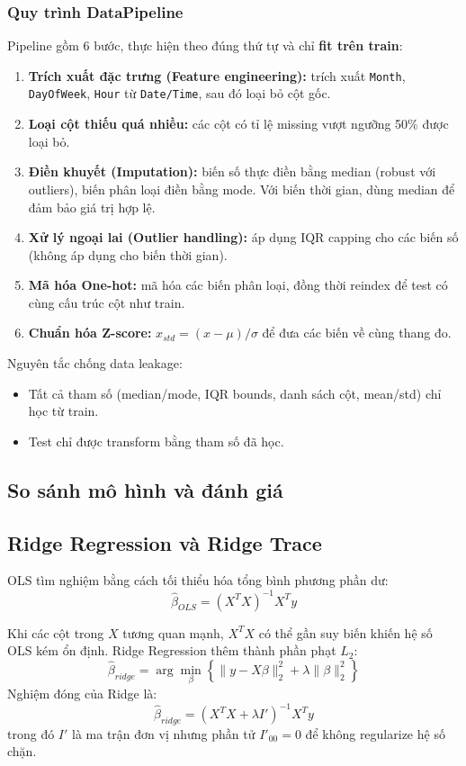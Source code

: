 \documentclass[a4paper]{article}
\begin{document}
\subsubsection{Quy trình DataPipeline}
Pipeline gồm 6 bước, thực hiện theo đúng thứ tự và chỉ \textbf{fit trên train}:
\begin{enumerate}
    \item \textbf{Trích xuất đặc trưng (Feature engineering):} trích xuất \texttt{Month}, \texttt{DayOfWeek}, \texttt{Hour} từ \texttt{Date/Time}, sau đó loại bỏ cột gốc.
    \item \textbf{Loại cột thiếu quá nhiều:} các cột có tỉ lệ missing vượt ngưỡng 50\% được loại bỏ.
    \item \textbf{Điền khuyết (Imputation):} biến số thực điền bằng median (robust với outliers), biến phân loại điền bằng mode. Với biến thời gian, dùng median để đảm bảo giá trị hợp lệ.
    \item \textbf{Xử lý ngoại lai (Outlier handling):} áp dụng IQR capping cho các biến số (không áp dụng cho biến thời gian).
    \item \textbf{Mã hóa One-hot:} mã hóa các biến phân loại, đồng thời reindex để test có cùng cấu trúc cột như train.
    \item \textbf{Chuẩn hóa Z-score:} $x_{std} = (x-\mu)/\sigma$ để đưa các biến về cùng thang đo.
\end{enumerate}

Nguyên tắc chống data leakage:
\begin{itemize}
    \item Tất cả tham số (median/mode, IQR bounds, danh sách cột, mean/std) chỉ học từ train.
    \item Test chỉ được transform bằng tham số đã học.
\end{itemize}

\subsection{So sánh mô hình và đánh giá}

\subsection{Ridge Regression và Ridge Trace}
OLS tìm nghiệm bằng cách tối thiểu hóa tổng bình phương phần dư:
\begin{equation}
\hat{\beta}_{OLS} = (X^T X)^{-1}X^T y
\end{equation}

Khi các cột trong $X$ tương quan mạnh, $X^T X$ có thể gần suy biến khiến hệ số OLS kém ổn định. Ridge Regression thêm thành phần phạt $L_2$:
\begin{equation}
\hat{\beta}_{ridge} = \arg\min_{\beta}\left\{\lVert y - X\beta \rVert_2^2 + \lambda \lVert \beta \rVert_2^2\right\}
\end{equation}
Nghiệm đóng của Ridge là:
\begin{equation}
\hat{\beta}_{ridge} = (X^T X + \lambda I')^{-1} X^T y
\end{equation}
trong đó $I'$ là ma trận đơn vị nhưng phần tử $I'_{00}=0$ để không regularize hệ số chặn.
\end{document}
